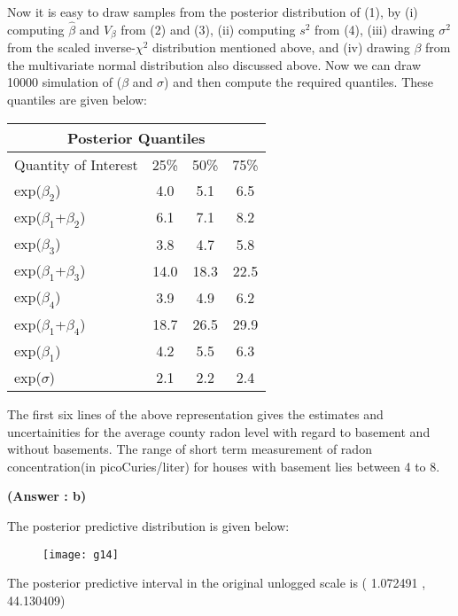 \documentclass[10pt]{article}
\begin{document}
Now it is easy to draw samples from the posterior distribution of (1), by (i) computing $\hat{\beta}$ and $V_{\beta}$ from (2) and (3), (ii) computing $s^{2}$ from (4), (iii) drawing $\sigma^{2}$ from the scaled inverse-$\chi^{2}$ distribution mentioned above, and (iv) drawing $\beta$ from the multivariate normal distribution also discussed above. Now we can draw 10000 simulation of ($\beta$ and $\sigma$) and then compute the required quantiles. These quantiles are given below:
\begin{center}
\begin{tabular}{|l|ccc|}
\multicolumn{4}{c}{Posterior Quantiles}\\\hline 
Quantity of Interest & 25\% & 50\% & 75\% \\ \hline 
exp($\beta_{2}$) & 4.0 & 5.1  & 6.5  \\ \hline 
exp($\beta_{1}$+$\beta_{2}$) & 6.1 & 7.1 & 8.2  \\ \hline
exp($\beta_{3}$) & 3.8 & 4.7 & 5.8   \\ \hline 
exp($\beta_{1}$+$\beta_{3}$) & 14.0 & 18.3 & 22.5   \\ \hline
exp($\beta_{4}$) & 3.9 & 4.9 & 6.2   \\ \hline 
exp($\beta_{1}$+$\beta_{4}$) & 18.7 & 26.5 & 29.9   \\ \hline 
exp($\beta_{1}$) & 4.2 & 5.5 & 6.3   \\ \hline
exp($\sigma$) & 2.1 & 2.2 & 2.4   \\ \hline
\end{tabular}
\end{center}
The first six lines of the above representation gives the estimates and uncertainities for the average county radon level with regard to basement and without basements. The range of short term measurement of radon concentration(in picoCuries/liter) for houses with basement lies between 4 to 8.
\begin{center}
\textbf{(Answer : b)}
\end{center}
The posterior predictive distribution is given below:
\begin{figure}[h]
\begin{center}
\texttt{[image: g14]}
\end{center}
\end{figure}
The posterior predictive interval in the original unlogged scale is ( 1.072491 , 44.130409) 
\end{document}
